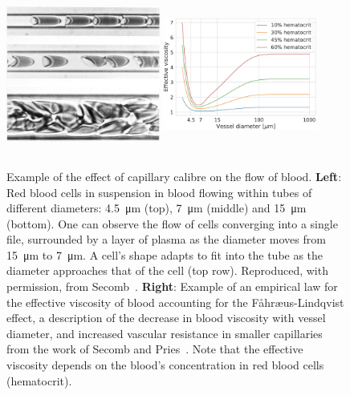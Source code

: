 \documentclass{article}
\begin{document}
\begin{figure}[t!]
  \centering
  \includegraphics[width=0.45\textwidth, height=5.3cm]{cropped-RBC-in-capillaries.jpg}
  \hfill
  \includegraphics[width=0.45\textwidth, height=5.3cm]{EffectiveViscosity-Secomb.jpeg}
  \caption{Example of the effect of capillary calibre on the flow of blood. \textbf{Left}: Red blood cells in suspension in blood flowing within tubes of different diameters: \SI{4.5}{\micro\meter} (top), \SI{7}{\micro\meter} (middle) and \SI{15}{\micro\meter} (bottom). One can observe the flow of cells converging into a single file, surrounded by a layer of plasma as the diameter moves from \SI{15}{\micro\meter} to \SI{7}{\micro\meter}. A cell's shape adapts to fit into the tube as the diameter approaches that of the cell (top row). Reproduced, with permission, from Secomb~\cite{Secomb_2003}. \textbf{Right}: Example of an empirical law for the effective viscosity of blood accounting for the F\r{a}hr\ae us-Lindqvist effect, a description of the decrease in blood viscosity with vessel diameter, and increased vascular resistance in smaller capillaries from the work of Secomb and Pries~\cite{Secomb_2013}. Note that the effective viscosity depends on the blood's concentration in red blood cells (hematocrit).}
  \label{fig:effectiveViscosity}
\end{figure}
\end{document}
